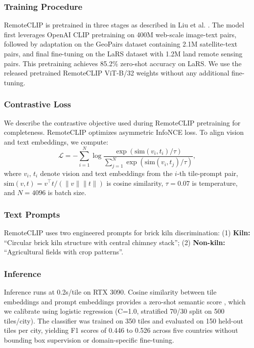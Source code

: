 \documentclass{article}
\theoremstyle{plain}
\theoremstyle{definition}
\theoremstyle{remark}
\begin{document}
\subsubsection{Training Procedure}
RemoteCLIP is pretrained in three stages as described in Liu et al. \cite{liu2024remoteclip}. The model first leverages OpenAI CLIP pretraining on 400M web-scale image-text pairs, followed by adaptation on the GeoPairs dataset containing 2.1M satellite-text pairs, and final fine-tuning on the LaRS dataset with 1.2M land remote sensing pairs. This pretraining achieves 85.2\% zero-shot accuracy on LaRS. We use the released pretrained RemoteCLIP ViT-B/32 weights without any additional fine-tuning.
\subsubsection{Contrastive Loss}
We describe the contrastive objective used during RemoteCLIP pretraining for completeness. RemoteCLIP optimizes asymmetric InfoNCE loss. To align vision and text embeddings, we compute:
\begin{equation}
\mathcal{L} = -\sum_{i=1}^N \log \frac{\exp(\text{sim}(v_i,t_i)/\tau)}{\sum_{j=1}^N \exp(\text{sim}(v_i,t_j)/\tau)}, \label{eq:remoteclip}
\end{equation}
where $v_i$, $t_i$ denote vision and text embeddings from the $i$-th tile-prompt pair, $\text{sim}(v,t) = v^\top t/(\|v\|\|t\|)$ is cosine similarity, $\tau=0.07$ is temperature, and $N=4096$ is batch size.

\subsubsection{Text Prompts}
RemoteCLIP uses two engineered prompts for brick kiln discrimination: (1) \textbf{Kiln:} ``Circular brick kiln structure with central chimney stack''; (2) \textbf{Non-kiln:} ``Agricultural fields with crop patterns''.

\subsubsection{Inference}
Inference runs at 0.2s/tile on RTX 3090. Cosine similarity between tile embeddings and prompt embeddings provides a zero-shot semantic score \cite{lee2021scalable}, which we calibrate using logistic regression (C=1.0, stratified 70/30 split on 500 tiles/city). The classifier was trained on 350 tiles and evaluated on 150 held-out tiles per city, yielding F1 scores of 0.446 to 0.526 across five countries without bounding box supervision or domain-specific fine-tuning.
\end{document}
